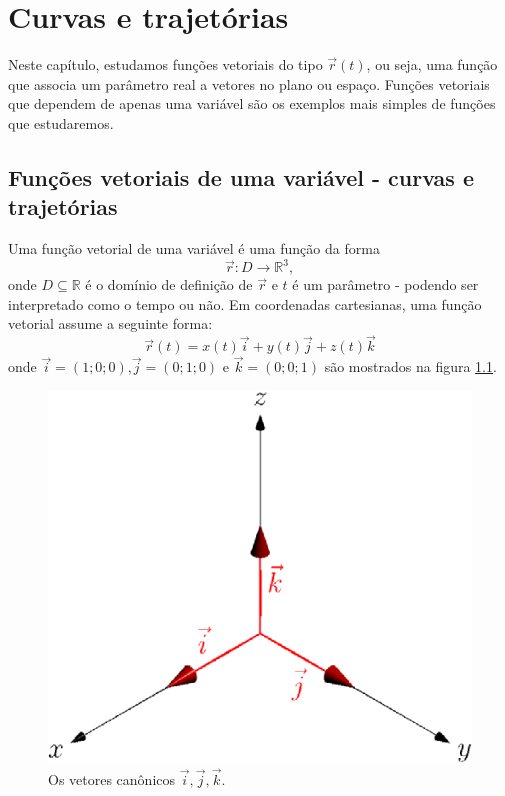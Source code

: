 
\chapter{Curvas e trajetórias}
  Neste capítulo, estudamos funções vetoriais do tipo $\vec{r}(t)$, ou seja, uma função que associa um parâmetro real a vetores no plano ou espaço. Funções vetoriais que dependem de apenas uma variável são os exemplos mais simples de funções que estudaremos. 

\section{Funções vetoriais de uma variável - curvas e trajetórias}
Uma função vetorial de uma variável é uma função da forma $$\vec{r}:D\to \mathbb{R}^3,$$ onde $D\subseteq \mathbb{R}$ é o domínio de definição de $\vec{r}$ e $t$ é um parâmetro - podendo ser interpretado como o tempo ou não. Em coordenadas cartesianas, uma função vetorial assume a seguinte forma:
$$\vec{r}(t)=x(t)\vec{i}+y(t)\vec{j}+z(t)\vec{k}$$
onde $\vec{i}=(1;0;0)$,$\vec{j}=(0;1;0)$ e $\vec{k}=(0;0;1)$ são mostrados na figura \ref{fig_vetijk}.

\begin{figure} \label{fig_vetijk}
\begin{center}
    \includegraphics{./cap_curvas/figs/vetores_ijk}
 \caption{Os vetores canônicos $\vec{i},\vec{j},\vec{k}$.}
  \end{center}
\end{figure}

